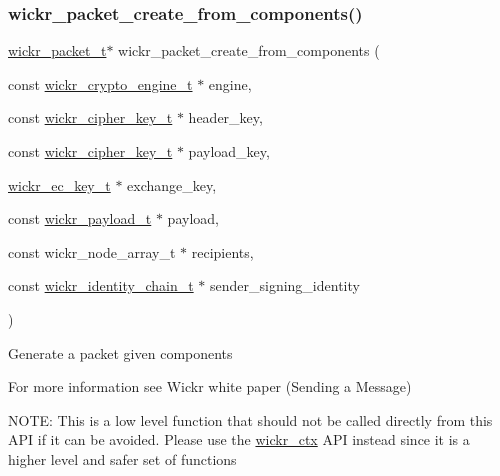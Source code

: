 \subsubsection{\texorpdfstring{wickr\+\_\+packet\+\_\+create\+\_\+from\+\_\+components()}{wickr\_packet\_create\_from\_components()}}
{\footnotesize\ttfamily \hyperlink{structwickr__packet}{wickr\+\_\+packet\+\_\+t}$\ast$ wickr\+\_\+packet\+\_\+create\+\_\+from\+\_\+components (\begin{DoxyParamCaption}\item[{const \hyperlink{structwickr__crypto__engine}{wickr\+\_\+crypto\+\_\+engine\+\_\+t} $\ast$}]{engine,  }\item[{const \hyperlink{structwickr__cipher__key}{wickr\+\_\+cipher\+\_\+key\+\_\+t} $\ast$}]{header\+\_\+key,  }\item[{const \hyperlink{structwickr__cipher__key}{wickr\+\_\+cipher\+\_\+key\+\_\+t} $\ast$}]{payload\+\_\+key,  }\item[{\hyperlink{structwickr__ec__key}{wickr\+\_\+ec\+\_\+key\+\_\+t} $\ast$}]{exchange\+\_\+key,  }\item[{const \hyperlink{structwickr__payload}{wickr\+\_\+payload\+\_\+t} $\ast$}]{payload,  }\item[{const wickr\+\_\+node\+\_\+array\+\_\+t $\ast$}]{recipients,  }\item[{const \hyperlink{structwickr__identity__chain}{wickr\+\_\+identity\+\_\+chain\+\_\+t} $\ast$}]{sender\+\_\+signing\+\_\+identity }\end{DoxyParamCaption})}

Generate a packet given components

For more information see Wickr white paper (Sending a Message)

N\+O\+TE\+: This is a low level function that should not be called directly from this A\+PI if it can be avoided. Please use the \textquotesingle{}\hyperlink{structwickr__ctx}{wickr\+\_\+ctx}\textquotesingle{} A\+PI instead since it is a higher level and safer set of functions


